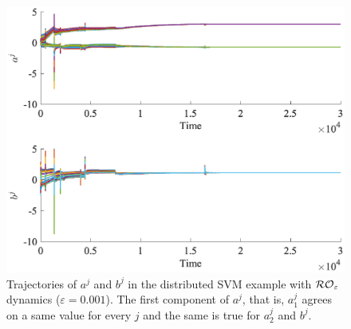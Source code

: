 \documentclass[journal,twoside,web]{ieeecolor}
\begin{document}


\begin{figure}
\begin{center}
\includegraphics[scale = 0.41]{trajectories_2_perturbed_eps0.001.eps}
\caption{Trajectories of $a^j$ and $b^j$ in the distributed SVM example with ${\cal RO}_\varepsilon$ dynamics ($\varepsilon=0.001$). The first component of $a^j$, that is, $a_1^j$ agrees on a same value for every $j$ and the same is true for $a_2^j$ and $b^j$.}
\label{trajectories_2_perturbed}
\end{center}
\end{figure}
\end{document}

